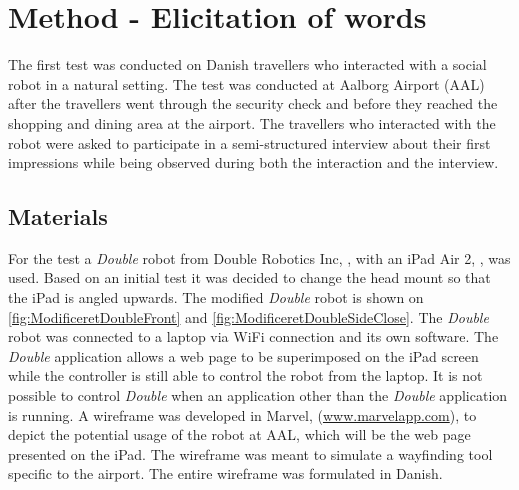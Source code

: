 \section{Method {\color{red}- Elicitation of words}}
\label{MethodElicitation}
%
The first test was conducted on Danish travellers who interacted with a social robot in a natural setting. The test was conducted at Aalborg Airport (AAL) after the travellers went through the security check and before they reached the shopping and dining area at the airport. The travellers who interacted with the robot were asked to participate in a semi-structured interview about their first impressions while being observed during both the interaction and the interview. 

\subsection{Materials}
For the test a \textit{Double} robot from Double Robotics Inc, \cite{WEB:Double}, with an iPad Air 2, \cite{WEB:iPadAir2}, was used. Based on an initial test it was decided to change the head mount so that the iPad is angled upwards. The modified \textit{Double} robot is shown on \autoref{fig:ModificeretDoubleFront} and \autoref{fig:ModificeretDoubleSideClose}. The \textit{Double} robot was connected to a laptop via WiFi connection and its own software. The \textit{Double} application allows a web page to be superimposed on the iPad screen while the controller is still able to control the robot from the laptop. It is not possible to control \textit{Double} when an application other than the \textit{Double} application is running. A wireframe was developed in Marvel, (\url{www.marvelapp.com}), to depict the potential usage of the robot at AAL, which will be the web page presented on the iPad. The wireframe was meant to simulate a wayfinding tool specific to the airport. The entire wireframe was formulated in Danish.

